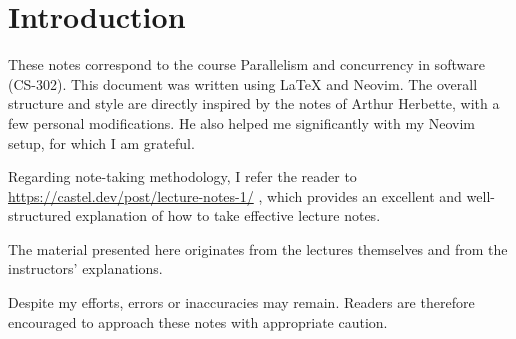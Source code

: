\section*{Introduction}
These notes correspond to the course Parallelism and concurrency in software (CS-302).
This document was written using LaTeX and Neovim. The overall structure and style are directly inspired by the notes of Arthur Herbette, with a few personal modifications. He also helped me significantly with my Neovim setup, for which I am grateful.

\noindent Regarding note-taking methodology, I refer the reader to
\url{https://castel.dev/post/lecture-notes-1/}
, which provides an excellent and well-structured explanation of how to take effective lecture notes.

\noindent The material presented here originates from the lectures themselves and from the instructors’ explanations.

\noindent Despite my efforts, errors or inaccuracies may remain. Readers are therefore encouraged to approach these notes with appropriate caution.
\newpage

